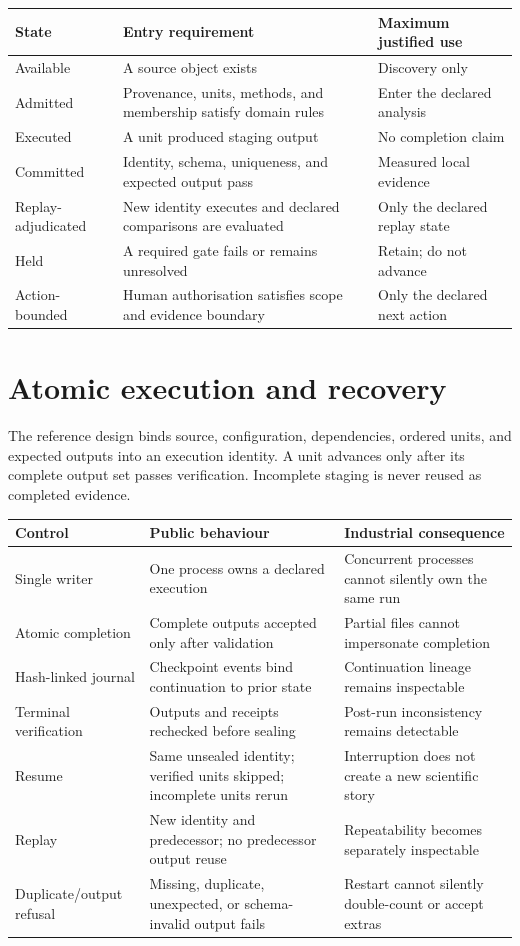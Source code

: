 \documentclass[9pt,a4paper]{article}
\begin{document}
\begin{tabularx}{\textwidth}{p{}YY}
\toprule State & Entry requirement & Maximum justified use\\\midrule
Available & A source object exists & Discovery only\\
Admitted & Provenance, units, methods, and membership satisfy domain rules & Enter the declared analysis\\
Executed & A unit produced staging output & No completion claim\\
Committed & Identity, schema, uniqueness, and expected output pass & Measured local evidence\\
Replay-adjudicated & New identity executes and declared comparisons are evaluated & Only the declared replay state\\
Held & A required gate fails or remains unresolved & Retain; do not advance\\
Action-bounded & Human authorisation satisfies scope and evidence boundary & Only the declared next action\\
\bottomrule
\end{tabularx}

\section{Atomic execution and recovery}
The reference design binds source, configuration, dependencies, ordered units, and expected outputs into an execution identity. A unit advances only after its complete output set passes verification. Incomplete staging is never reused as completed evidence.

\begin{tabularx}{\textwidth}{p{}YY}
\toprule Control & Public behaviour & Industrial consequence\\\midrule
Single writer & One process owns a declared execution & Concurrent processes cannot silently own the same run\\
Atomic completion & Complete outputs accepted only after validation & Partial files cannot impersonate completion\\
Hash-linked journal & Checkpoint events bind continuation to prior state & Continuation lineage remains inspectable\\
Terminal verification & Outputs and receipts rechecked before sealing & Post-run inconsistency remains detectable\\
Resume & Same unsealed identity; verified units skipped; incomplete units rerun & Interruption does not create a new scientific story\\
Replay & New identity and predecessor; no predecessor output reuse & Repeatability becomes separately inspectable\\
Duplicate/output refusal & Missing, duplicate, unexpected, or schema-invalid output fails & Restart cannot silently double-count or accept extras\\
\bottomrule
\end{tabularx}
\end{document}
